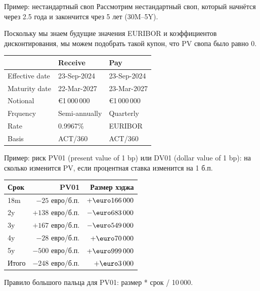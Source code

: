 \documentclass{beamer}
\renewcommand{\EUR}[1]{\textup{\euro}#1}
\begin{document}
\begin{frame}{Пример: нестандартный своп}
\justify
Рассмотрим нестандартный своп, который начнётся через 2.5 года и закончится чрез 5 лет 
(30M--5Y).

\justify
Поскольку мы знаем будущие значения EURIBOR и коэффициентов дисконтирования, мы можем 
подобрать такой купон, что PV свопа было равно 0.

\justify
\centering
\begin{tabular}{l|l|l}
& Receive & Pay \\ \hline
Effective date & 23-Sep-2024 & 23-Sep-2024 \\ 
Maturity date  & 22-Mar-2027 & 23-Mar-2027 \\
Notional       & \EUR{1\,000\,000} & \EUR{1\,000\,000} \\
Frquency       & Semi-annually     & Quarterly \\
Rate           & \alert{0.9967\%}          & EURIBOR   \\
Basis          & ACT/360           & ACT/360
\end{tabular}
\end{frame}



\begin{frame}{Пример: риск}
\justify
PV01 (present value of 1 bp) или DV01 (dollar value of 1 bp): на сколько изменится
PV, если процентная ставка изменится на 1 б.п.

\justify
\centering
\begin{tabular}{l|r|r}
Срок  & PV01 & Размер хэджа \\ \hline
18m   & $-25$  евро/б.п. & $+\EUR{166\,000}$ \\
2y    & $+138$ евро/б.п. & $-\EUR{683\,000}$ \\
3y    & $+167$ евро/б.п. & $-\EUR{549\,000}$ \\
4y    & $-28$  евро/б.п. & $+\EUR{70\,000}$ \\
5y    & $-500$ евро/б.п. & $+\EUR{999\,000}$ \\ \hline
Итого & $-248$ евро/б.п. & $+\EUR{3\,000}$
\end{tabular}

\justify
Правило большого пальца для PV01: размер * срок / 10\,000.
\end{frame}
\end{document}
